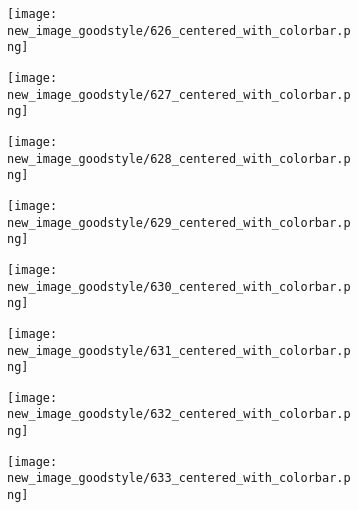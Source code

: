 \documentclass[a4paper,12pt]{article}
\begin{document}
\begin{figure}[H]
  \begin{subfigure}{0.11\textwidth}
    \texttt{[image: new\_image\_goodstyle/626\_centered\_with\_colorbar.png]}
  \end{subfigure}
  \hfill
  \begin{subfigure}{0.11\textwidth}
    \texttt{[image: new\_image\_goodstyle/627\_centered\_with\_colorbar.png]}
  \end{subfigure}
  \hfill
  \begin{subfigure}{0.11\textwidth}
    \texttt{[image: new\_image\_goodstyle/628\_centered\_with\_colorbar.png]}
  \end{subfigure}
  \hfill
  \begin{subfigure}{0.11\textwidth}
    \texttt{[image: new\_image\_goodstyle/629\_centered\_with\_colorbar.png]}
  \end{subfigure}
  \hfill
  \begin{subfigure}{0.11\textwidth}
    \texttt{[image: new\_image\_goodstyle/630\_centered\_with\_colorbar.png]}
  \end{subfigure}
  \hfill
  \begin{subfigure}{0.11\textwidth}
    \texttt{[image: new\_image\_goodstyle/631\_centered\_with\_colorbar.png]}
  \end{subfigure}
  \hfill
  \begin{subfigure}{0.11\textwidth}
    \texttt{[image: new\_image\_goodstyle/632\_centered\_with\_colorbar.png]}
  \end{subfigure}
  \hfill
  \begin{subfigure}{0.11\textwidth}
    \texttt{[image: new\_image\_goodstyle/633\_centered\_with\_colorbar.png]}
  \end{subfigure}
  \hfill
\end{figure}
\end{document}
